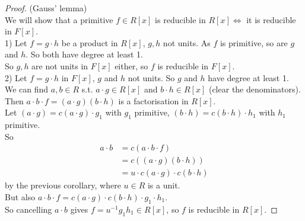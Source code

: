 \documentclass[a4paper]{article}
\begin{document}
\begin{proof}(Gauss' lemma)\\
We will show that a primitive $f\in R[x]$ is reducible in $R[x] \iff$ it is reducible in $F[x]$.\\
1) Let $f=g\cdot h$ be a product in $R[x]$, $g,h$ not units. As $f$ is primitive, so are $g$ and $h$. So both have degree at least 1.\\
So $g,h$ are not units in $F[x]$ either, so $f$ is reducible in $F[x]$.\\
2) Let $f=g\cdot h$ in $F[x]$, $g$ and $h$ not units. So $g$ and $h$ have degree at least 1.\\
We can find $a,b\in R$ s.t. $a\cdot g\in R[x]$ and $b\cdot h\in R[x]$ (clear the denominators).\\
Then $a\cdot b\cdot f = \left(a\cdot g\right)\left(b\cdot h\right)$ is a factorisation in $R[x]$.\\
Let $\left(a\cdot g\right)=c\left(a\cdot g\right)\cdot g_1$ with $g_1$ primitive, $\left(b\cdot h\right)=c\left(b\cdot h\right)\cdot h_1$ with $h_1$ primitive.\\
So 
\begin{equation*}
\begin{aligned}
a\cdot b &= c\left(a\cdot b\cdot f\right)\\
&= c\left(\left(a\cdot g\right)\left(b\cdot h\right)\right)\\
&= u\cdot c\left(a\cdot g\right)\cdot c\left(b\cdot h\right)
\end{aligned}
\end{equation*}
by the previous corollary, where $u\in R$ is a unit.\\
But also $a\cdot b\cdot f=c\left(a\cdot g\right)\cdot c\left(b\cdot h\right)\cdot g_1 \cdot h_1$.\\
So cancelling $a\cdot b$ gives $f=u^{-1} g_1h_1 \in R[x] 
$, so $f$ is reducible in $R[x]$.
\end{proof}
\end{document}
